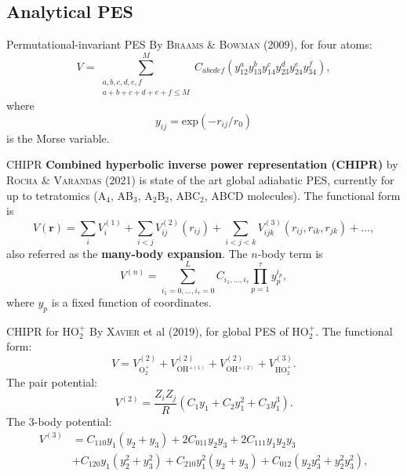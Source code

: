 \documentclass{beamer}
\begin{document}
\subsection{Analytical PES}
\begin{frame}{Permutational-invariant PES}
By \textsc{Braams \& Bowman} (2009), for four atoms:
    \begin{equation}
        V = \sum^M_{\substack{a,b,c,d,e,f \\ a+b+c+d+e+f \leq M}}C_{abcdef}\left(y_{12}^a y_{13}^b y_{14}^c y_{23}^d y_{24}^e y_{34}^f\right),
        \label{eq:monomialc2h2}
    \end{equation}
    where
    \begin{equation}
        y_{ij} = \text{exp}(-r_{ij}/r_0)
        \label{eq:morse}
    \end{equation}
    is the Morse variable.
\end{frame}
\begin{frame}{CHIPR}
    \textbf{Combined hyperbolic inverse power representation (CHIPR)} by \textsc{Rocha \& Varandas} (2021) is state of the art global adiabatic PES, currently for up to tetratomics (A$_4$, AB$_3$, A$_2$B$_2$, ABC$_2$, ABCD molecules). The functional form is
    \begin{equation}
        V(\mathbf{r}) = \sum_i V_i^{(1)} + \sum_{i<j} V_{ij}^{(2)}(r_{ij}) + \sum_{i<j<k} V_{ijk}^{(3)}(r_{ij},r_{ik},r_{jk}) + ... ,
        \label{eq:chiprexpansion}
    \end{equation}
    also referred as the \textbf{many-body expansion}. The $n$-body term is
    \begin{equation}
        V^{(n)} = \sum^L_{i_1=0,...,i_\tau=0}C_{i_1,...,i_\tau}\prod^\tau_{p=1} y_p^{i_p},
        \label{eq:chiprnbody}
    \end{equation}
    where $y_p$ is a fixed function of coordinates.
\end{frame}
\begin{frame}{CHIPR for HO$_2^+$}
    By \textsc{Xavier} et al (2019), for global PES of HO$_2^+$. The functional form:
    \begin{equation}
        V = V^{(2)}_{\text{O$_2^+$}} + V^{(2)}_{\text{OH$^{+(1)}$}} + V^{(2)}_{\text{OH$^{+(2)}$}} +
        V^{(3)}_{\text{HO$_2^+$}}.
        \label{eq:ho2+chipr}
    \end{equation}
    The pair potential:
    \begin{equation}
        V^{(2)} = \frac{Z_iZ_j}{R}(C_1y_1 + C_2y_1^2 + C_3y_1^3).
        \label{eq:ho2+chiprv2}
    \end{equation}
    The 3-body potential:
    \begin{equation}
        \begin{split}
            V^{(3)} &= C_{110}y_1(y_2 + y_3) + 2C_{011}y_2y_3 +
            2C_{111}y_1y_2y_3 
            \\&+ C_{120}y_1(y_2^2 + y_3^2) + C_{210}y_1^2(y_2+y_3) + C_{012}(y_2y_3^2 + y_2^2y_3^2),
        \end{split}
        \label{eq:ho2+chiprv3}
    \end{equation}
    
\end{frame}
\end{document}
